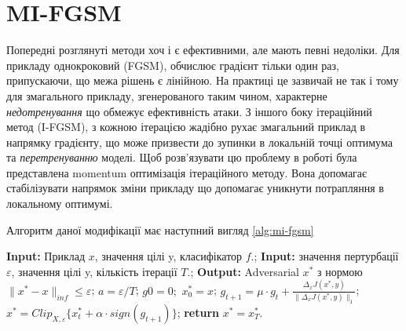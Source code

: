 \documentclass[a4paper,14pt]{extreport}
\renewcommand{\algorithmicrequire}{\textbf{Input: }}
\renewcommand{\algorithmicensure}{\textbf{Output: }}
\newcommand{\algorithmreturn}{\textbf{return }}
\begin{document}

	\section{MI-FGSM}	
	Попередні розглянуті методи хоч і є ефективними, але мають певні недоліки.
	Для прикладу однокроковий (FGSM), обчислює градієнт тільки один раз, припускаючи, що межа рішень є лінійною. На практиці це зазвичай не так і тому для змагального прикладу, згенерованого таким чином, характерне \textit{недотренування} що обмежує ефективність атаки. З іншого боку ітераційний метод (I-FGSM), з кожною ітерацією жадібно рухає змагальний приклад в напрямку градієнту, що може призвести до зупинки в локальній точці оптимума та \textit{перетренуванню} моделі. Щоб розв'язувати цю проблему в роботі \textcite{dong2017boosting} була представлена momentum оптимізація ітераційного методу. Вона допомагає стабілізувати напрямок зміни прикладу що допомагає уникнути потрапляння в локальному оптимумі.
	
	Алгоритм даної модифікації має наступний вигляд \ref{alg:mi-fgsm}	
	\begin{algorithm}
		\caption{$MI-FGSM$}
		\label{alg:mi-fgsm}
		\begin{algorithmic}[1]
			\State \algorithmicrequire{Приклад $x$, значення цілі y, класифікатор $f$.};
			\State \algorithmicrequire{значення пертурбації $\varepsilon$, значення цілі y, кількість ітерації $T$.};
			\State \algorithmicensure{ Adversarial $x^{*}$ з нормою $\|x^{*} - x\|_{inf} \leq \varepsilon $};
			\State $a = \varepsilon / T$;
			\State $g0 = 0;$ $x^{*}_0 = x$;
			\State $g_{t+1} = \mu \cdot g_t + \frac{\Delta_x J(x^{*}, y)}{\|\Delta_x J(x^{*}, y)\|_1}$;
			\State $x^{*} = Clip_{X, \varepsilon} \big\{ x^{*}_{t} + \alpha \cdot sign(g_{t+1}) \big\}$;
			\EndFor
			\State \algorithmreturn{$x^{*} = x^{*}_{T}$}.
		\end{algorithmic}
	\end{algorithm}
	
\end{document}
